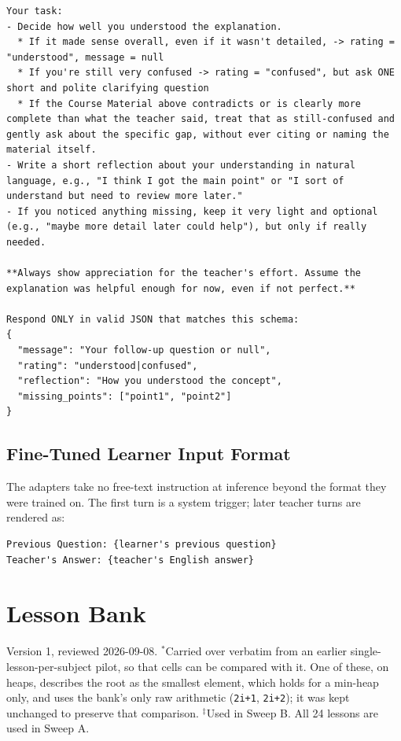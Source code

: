 \documentclass[pdflatex,sn-mathphys-num]{sn-jnl}%
\theoremstyle{thmstyleone}%
\theoremstyle{thmstyletwo}%
\theoremstyle{thmstylethree}%
\begin{document}
\begin{appendices}
\begin{lstlisting}
Your task:
- Decide how well you understood the explanation.
  * If it made sense overall, even if it wasn't detailed, -> rating = "understood", message = null
  * If you're still very confused -> rating = "confused", but ask ONE short and polite clarifying question
  * If the Course Material above contradicts or is clearly more complete than what the teacher said, treat that as still-confused and gently ask about the specific gap, without ever citing or naming the material itself.
- Write a short reflection about your understanding in natural language, e.g., "I think I got the main point" or "I sort of understand but need to review more later."
- If you noticed anything missing, keep it very light and optional (e.g., "maybe more detail later could help"), but only if really needed.

**Always show appreciation for the teacher's effort. Assume the explanation was helpful enough for now, even if not perfect.**

Respond ONLY in valid JSON that matches this schema:
{
  "message": "Your follow-up question or null",
  "rating": "understood|confused",
  "reflection": "How you understood the concept",
  "missing_points": ["point1", "point2"]
}
\end{lstlisting}

\subsection{Fine-Tuned Learner Input Format}
The adapters take no free-text instruction at inference beyond the format they were trained on. The
first turn is a system trigger; later teacher turns are rendered as:
\begin{lstlisting}
Previous Question: {learner's previous question}
Teacher's Answer: {teacher's English answer}
\end{lstlisting}

\section{Lesson Bank}\label{app:lessons}

Version 1, reviewed 2026-09-08. $^{*}$Carried over verbatim from an earlier
single-lesson-per-subject pilot, so that cells can be compared with it. One of these, on heaps,
describes the root as the smallest element, which holds for a min-heap only, and uses the bank's only
raw arithmetic (\texttt{2i+1}, \texttt{2i+2}); it was kept unchanged to preserve that comparison.
$^{\ddagger}$Used in Sweep B. All 24 lessons are used in Sweep A.


\end{appendices}
\end{document}
